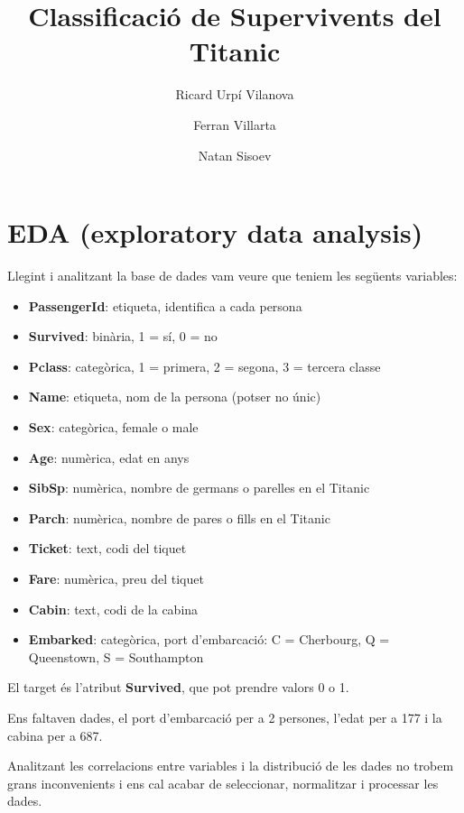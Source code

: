 \documentclass[9pt,a4paper,twoside]{tau-class/tau}
\title{Classificació de Supervivents del Titanic}
\author[a,1]{Ricard Urpí Vilanova}
\author[b,2]{Ferran Villarta}
\author[c,3]{Natan Sisoev}
\affil[a]{1711326}
\affil[b]{1704051}
\affil[c]{1706198}
\begin{document}
    \maketitle
    \thispagestyle{firststyle} \tauabstract
    \tableofcontents
    \linenumbers


\section{EDA (exploratory data analysis)}

Llegint i analitzant la base de dades vam veure que teniem les següents variables:

\begin{itemize}
    \item \textbf{PassengerId}: etiqueta, identifica a cada persona
    \item \textbf{Survived}: binària, 1 = sí, 0 = no
    \item \textbf{Pclass}: categòrica, 1 = primera, 2 = segona, 3 = tercera classe
    \item \textbf{Name}: etiqueta, nom de la persona (potser no únic)
    \item \textbf{Sex}: categòrica, female o male
    \item \textbf{Age}: numèrica, edat en anys
    \item \textbf{SibSp}: numèrica, nombre de germans o parelles en el Titanic
    \item \textbf{Parch}: numèrica, nombre de pares o fills en el Titanic
    \item \textbf{Ticket}: text, codi del tiquet
    \item \textbf{Fare}: numèrica, preu del tiquet
    \item \textbf{Cabin}: text, codi de la cabina
    \item \textbf{Embarked}: categòrica, port d'embarcació: C = Cherbourg, Q = Queenstown, S = Southampton
\end{itemize}

El target és l'atribut \textbf{Survived}, que pot prendre valors 0 o 1.

Ens faltaven dades, el port d'embarcació per a 2 persones, l'edat per a 177 i la cabina per a 687.

Analitzant les correlacions entre variables i la distribució de les dades no trobem grans inconvenients i ens cal acabar de seleccionar, normalitzar i processar les dades.
\end{document}
